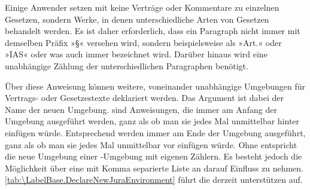 Einige Anwender setzen mit  keine Verträge oder Kommentare
zu einzelnen Gesetzen, sondern Werke, in denen unterschiedliche Arten von
Gesetzen behandelt werden. Es ist daher erforderlich, dass ein Paragraph
nicht immer mit demselben Präfix »\S« versehen wird, sondern beispielsweise
als »Art.« oder »IAS« oder was auch immer bezeichnet wird. Darüber hinaus wird
eine unabhängige Zählung der unterschiedlichen Paragraphen benötigt.

\begin{Declaration}
\end{Declaration}
Über diese Anweisung können weitere,
voneinander unabhängige Umgebungen für Vertrags- oder Gesetzestexte deklariert
werden.  Das Argument  ist dabei der Name der neuen
Umgebung.  sind Anweisungen, die immer am Anfang der
Umgebung ausgeführt werden, ganz als ob man sie jedes Mal unmittelbar hinter
 einfügen würde. Entsprechend werden
 immer am Ende der Umgebung ausgeführt, ganz als ob man
sie jedes Mal unmittelbar vor  einfügen würde. Ohne
 entspricht die neue Umgebung  einer
-Umgebung mit eigenen Zählern. Es besteht
jedoch die Möglichkeit über eine mit Komma separierte Liste an
 darauf Einfluss zu
nehmen. \autoref{tab:\LabelBase.DeclareNewJuraEnvironment} führt die derzeit
unterstützen  auf.

